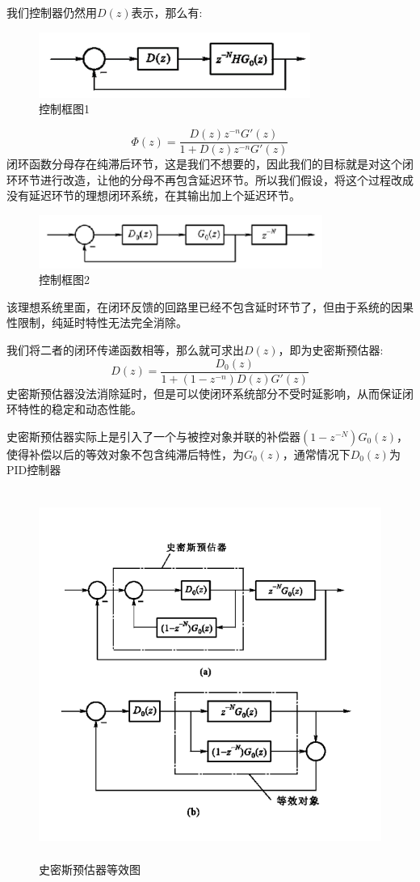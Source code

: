 \documentclass[12pt, a4paper, oneside]{ctexbook}
\begin{document}
我们控制器仍然用$D(z)$表示，那么有:
\begin{figure}[htbp]
	\centering
	\includegraphics[width=8.88cm,height=2.15cm]{img/6_4.png}
	\caption{控制框图1}
\end{figure}

$$
\varPhi(z)=\frac{D(z)z^{-n}G'(z)}{1+{D(z)z^{-n}G'(z)}}
$$
闭环函数分母存在纯滞后环节，这是我们不想要的，因此我们的目标就是对这个闭环环节进行改造，让他的分母不再包含延迟环节。所以我们假设，将这个过程改成没有延迟环节的理想闭环系统，在其输出加上个延迟环节。
\begin{figure}[htbp]
	\centering
	\includegraphics[width=9.29cm,height=1.74cm]{img/6_5.png}
	\caption{控制框图2}
\end{figure}
该理想系统里面，在闭环反馈的回路里已经不包含延时环节了，但由于系统的因果性限制，纯延时特性无法完全消除。

我们将二者的闭环传递函数相等，那么就可求出$D(z)$，即为史密斯预估器:
$$
D(z)=\frac{D_0(z)}{1+(1-z^{-n})D(z)G'(z)}
$$
史密斯预估器没法消除延时，但是可以使闭环系统部分不受时延影响，从而保证闭环特性的稳定和动态性能。

史密斯预估器实际上是引入了一个与被控对象并联的补偿器$(1-z^{-N})G_0(z)$，使得补偿以后的等效对象不包含纯滞后特性，为$G_0(z)$，通常情况下$D_0(z)$为PID控制器
\begin{figure}[htbp]
	\centering
	\includegraphics[width=12.4cm,height=12.06cm]{img/6_12.png}
	\caption{史密斯预估器等效图}
\end{figure}
\end{document}
